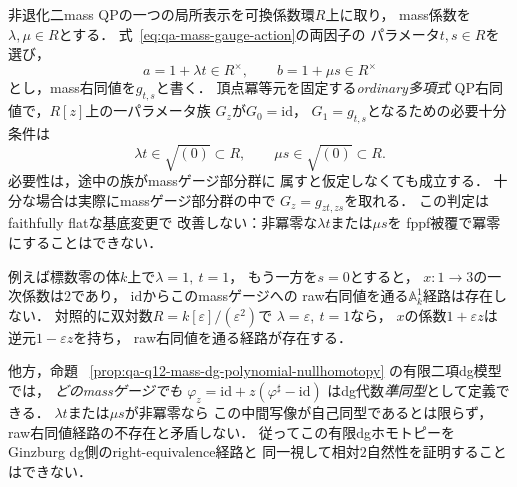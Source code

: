 \begin{proposition}
\label{prop:qa-q12-raw-mass-a1-path-obstruction}
非退化二mass QPの一つの局所表示を可換係数環$R$上に取り，
mass係数を$\lambda,\mu\in R$とする．
式~\eqref{eq:qa-mass-gauge-action}の両因子の
パラメータ$t,s\in R$を選び，
\[
 a=1+\lambda t\in R^\times,\qquad
 b=1+\mu s\in R^\times
\]
とし，mass右同値を$g_{t,s}$と書く．
頂点冪等元を固定する\emph{ordinary多項式}
QP右同値で，$R[z]$上の一パラメータ族
$G_z$が$G_0=\mathrm{id}$，
$G_1=g_{t,s}$となるための必要十分条件は
\[
 \boxed{\quad
 \lambda t\in\sqrt{(0)}\subset R,\qquad
 \mu s\in\sqrt{(0)}\subset R .
 \quad}
 \tag{AP}\label{eq:qa-q12-raw-a1-nilpotent-criterion}
\]
必要性は，途中の族がmassゲージ部分群に
属すと仮定しなくても成立する．
十分な場合は実際にmassゲージ部分群の中で
$G_z=g_{zt,zs}$を取れる．
この判定はfaithfully flatな基底変更で
改善しない：非冪零な$\lambda t$または$\mu s$を
fppf被覆で冪零にすることはできない．

例えば標数零の体$k$上で$\lambda=1,\ t=1$，
もう一方を$s=0$とすると，
$x:1\to3$の一次係数は$2$であり，
$\mathrm{id}$からこのmassゲージへの
raw右同値を通る$\mathbb A^1_k$経路は存在しない．
対照的に双対数$R=k[\varepsilon]/(\varepsilon^2)$で
$\lambda=\varepsilon,\ t=1$なら，
$x$の係数$1+\varepsilon z$は
逆元$1-\varepsilon z$を持ち，
raw右同値を通る経路が存在する．

他方，命題~
\ref{prop:qa-q12-mass-dg-polynomial-nullhomotopy}
の有限二項dg模型では，
\emph{どのmassゲージでも}
$\varphi_z=\mathrm{id}+z(\varphi^\sharp-\mathrm{id})$
はdg代数\emph{準同型}として定義できる．
$\lambda t$または$\mu s$が非冪零なら
この中間写像が自己同型であるとは限らず，
raw右同値経路の不存在と矛盾しない．
従ってこの有限dgホモトピーを
Ginzburg dg側のright-equivalence経路と
同一視して相対$2$自然性を証明することはできない．
\end{proposition}
